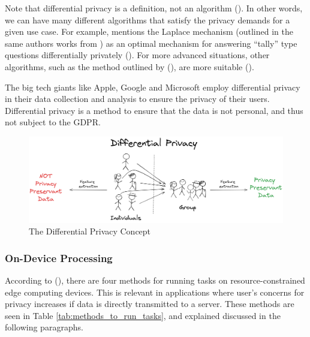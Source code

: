 Note that differential privacy is a definition, not an algorithm (\cite{dw2011DifferentialP}). In other words, we can have many different algorithms that satisfy the privacy demands for a given use case. For example, \citeauthor{dw2011DifferentialP} mentions the Laplace mechanism (outlined in the same authors works from \citeyear{dw2006noise2sensitivity-laplace}) as an optimal mechanism for answering “tally” type questions differentially privately (\citeyear{dw2011DifferentialP}). For more advanced situations, other algorithms, such as the method outlined by \citeauthor{bl2011learning-privacy} (\citeyear{bl2011learning-privacy}), are more suitable (\cite{dw2011DifferentialP}).

The big tech giants like Apple, Google and Microsoft employ differential privacy in their data collection and analysis to ensure the privacy of their users. Differential privacy is a method to ensure that the data is not personal, and thus not subject to the GDPR.

\begin{figure}[H]
    \centering
    \includegraphics[width=\linewidth]{Images/Diagrams/differential-privacy.png}
    \caption{\centering The Differential Privacy Concept}
    \label{fig:differential-privacy}
\end{figure}

\subsubsection{On-Device Processing}
According to \citeauthor{hu2022accurateobjectdetectionatedge} (\citeyear{hu2022accurateobjectdetectionatedge}), there are four methods for running tasks on resource-constrained edge computing devices. This is relevant in applications where user's concerns for privacy increases if data is directly transmitted to a server. These methods are seen in Table \ref{tab:methods_to_run_tasks}, and explained discussed in the following paragraphs.

